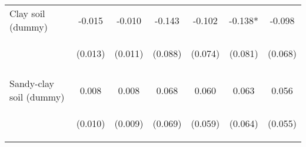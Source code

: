 \begin{center}
\begin{tabular}{lcccccc}
Clay soil (dummy) & -0.015 & -0.010 & -0.143 & -0.102 & -0.138* & -0.098 \\
 & \begin{footnotesize}(0.013)\end{footnotesize} & \begin{footnotesize}(0.011)\end{footnotesize} & \begin{footnotesize}(0.088)\end{footnotesize} & \begin{footnotesize}(0.074)\end{footnotesize} & \begin{footnotesize}(0.081)\end{footnotesize} & \begin{footnotesize}(0.068)\end{footnotesize} \\
\vspace{4pt} & \begin{footnotesize}[0.260]\end{footnotesize} & \begin{footnotesize}[0.345]\end{footnotesize} & \begin{footnotesize}[0.103]\end{footnotesize} & \begin{footnotesize}[0.171]\end{footnotesize} & \begin{footnotesize}[0.088]\end{footnotesize} & \begin{footnotesize}[0.151]\end{footnotesize} \\
Sandy-clay soil (dummy) & 0.008 & 0.008 & 0.068 & 0.060 & 0.063 & 0.056 \\
 & \begin{footnotesize}(0.010)\end{footnotesize} & \begin{footnotesize}(0.009)\end{footnotesize} & \begin{footnotesize}(0.069)\end{footnotesize} & \begin{footnotesize}(0.059)\end{footnotesize} & \begin{footnotesize}(0.064)\end{footnotesize} & \begin{footnotesize}(0.055)\end{footnotesize} \\

\end{tabular}
\end{center}
